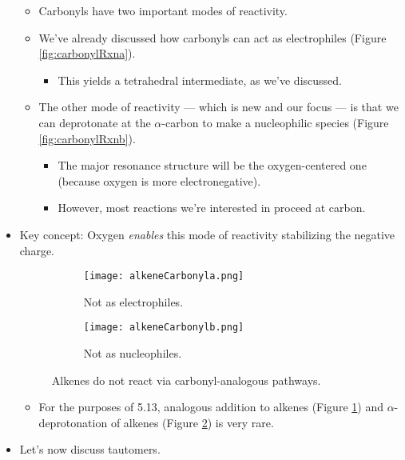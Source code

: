 \documentclass[../notes.tex]{subfiles}
\begin{document}
\begin{itemize}
\begin{itemize}
        \item Carbonyls have two important modes of reactivity.
        \item We've already discussed how carbonyls can act as electrophiles (Figure \ref{fig:carbonylRxna}).
        \begin{itemize}
            \item This yields a tetrahedral intermediate, as we've discussed.
        \end{itemize}
        \item The other mode of reactivity --- which is new and our focus --- is that we can deprotonate at the $\alpha$-carbon to make a nucleophilic species (Figure \ref{fig:carbonylRxnb}).
        \begin{itemize}
            \item The major resonance structure will be the oxygen-centered one (because oxygen is more electronegative).
            \item However, most reactions we're interested in proceed at carbon.
        \end{itemize}
    \end{itemize}
    \item Key concept: Oxygen \emph{enables} this mode of reactivity stabilizing the negative charge.
    \begin{figure}[h!]
        \centering
        \begin{subfigure}[b]{0.25\linewidth}
            \centering
            \texttt{[image: alkeneCarbonyla.png]}
            \caption{Not as electrophiles.}
            \label{fig:alkeneCarbonyla}
        \end{subfigure}
        \begin{subfigure}[b]{0.25\linewidth}
            \centering
            \texttt{[image: alkeneCarbonylb.png]}
            \caption{Not as nucleophiles.}
            \label{fig:alkeneCarbonylb}
        \end{subfigure}
        \caption{Alkenes do not react via carbonyl-analogous pathways.}
        \label{fig:alkeneCarbonyl}
    \end{figure}
    \begin{itemize}
        \item For the purposes of 5.13, analogous addition to alkenes (Figure \ref{fig:alkeneCarbonyla}) and $\alpha$-deprotonation of alkenes (Figure \ref{fig:alkeneCarbonylb}) is very rare.
    \end{itemize}
    \item Let's now discuss tautomers.

\end{itemize}
\end{document}
